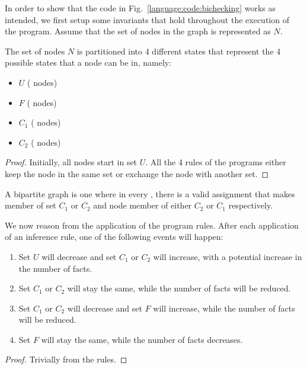 In order to show that the code in Fig.~\ref{language:code:bichecking} works as
intended, we first setup some invariants that hold throughout the execution of
the program. Assume that the set of nodes in the graph is represented as $N$.

\begin{invariant}
The set of nodes $N$ is partitioned into 4 different states that represent the 4
possible states that a node can be in, namely:

\begin{itemize}
   \item $U$ ( nodes)
   \item $F$ ( nodes)
   \item $C_{1}$ ( nodes)
   \item $C_{2}$ ( nodes)
\end{itemize}
\end{invariant}
\begin{proof}
Initially, all nodes start in set $U$. All the 4 rules of the programs either
keep the node in the same set or exchange the node with another set.
\end{proof}

A bipartite graph is one where in every , there is a valid
   assignment that makes  member of set $C_{1}$ or $C_{2}$ and node
    member of either $C_{2}$ or $C_{1}$ respectively.

\begin{variant}\label{language:lemma:bipartite_convergence}

   We now reason from the application of the program rules. After each
   application of an inference rule, one of the following events will happen:

   \begin{enumerate}
      \item Set $U$ will decrease and set $C_{1}$ or $C_{2}$ will
         increase, with a potential increase in the number of 
         facts.
      \item Set $C_{1}$ or $C_{2}$ will stay the same, while the number
         of  facts will be reduced.

      \item Set $C_{1}$ or $C_{2}$ will decrease and set $F$ will
         increase, while the number of  facts will be reduced.

      \item Set $F$ will stay the same, while the number of  facts
         decreases.
   \end{enumerate}

\end{variant}
\begin{proof}
Trivially from the rules.
\end{proof}

